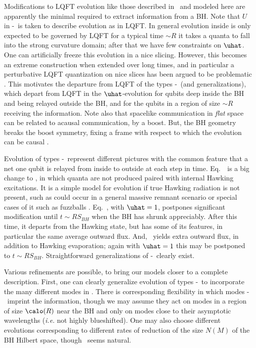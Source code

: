 Modifications to LQFT evolution like those described in \NLvC\ and modeled here are apparently the minimal required to extract information from a BH.  Note that $U$ in \evolone-\evolthree\ is taken to describe evolution as in LQFT.  In general evolution inside is only expected to be governed by LQFT for a typical time $\sim R$ it takes a quanta to fall into the strong curvature domain; after that we have few constraints on $\uhat$.  One can artificially freeze this evolution in a nice slicing.  However, this becomes an extreme construction when extended over long times, and in particular a perturbative LQFT quantization on nice slices has been argued to be problematic .  This motivates the departure from LQFT of the types \evolone-\evolthree\ (and generalizations), which depart from LQFT in the $\uhat$-evolution for qubits deep inside the BH and being relayed outside the BH, and for the qubits in a region of size $\sim R$ receiving the information.  Note also that spacelike communication in {\it flat} space can be related to acausal communication, by a boost.  But, the BH geometry breaks the boost symmetry, fixing a frame with respect to which the evolution can be causal .

Evolution of types \evolone-\evolthree\ represent different pictures with the common feature that a net one qubit is relayed from inside to outside at each step in time.  Eq.~\evolone\ is a big change to \hawkstate, in which quanta are not produced paired with internal Hawking excitations.  It is a simple model for evolution if true Hawking radiation is not present, such as could occur in a general massive remnant scenario  or special cases of it such as fuzzballs .  Eq.~\evoltwo, with $\uhat=1$, postpones significant modification until $t\sim R S_{BH}$ when the BH has shrunk appreciably. After this time, it departs from the Hawking state, but has some of its features, in particular the same average outward flux.  And, \evolthree\ yields extra outward flux, in addition to Hawking evaporation; again with $\uhat=1$ this may be postponed to $t\sim R S_{BH}$.  Straightforward generalizations of \evolone-\evolthree\ clearly exist.


Various refinements are possible, to bring our models closer to a complete description.  First, one can clearly generalize evolution of types \evolone-\evolthree\ to incorporate the many different modes in \hawkstate.  There is corresponding flexibility in which modes \evolone-\evolthree\ imprint the information, though we may assume they act on modes in a region of size $\calo(R)$ near the BH and only on modes close to their asymptotic wavelengths ({\it i.e.} not highly blueshifted).  One may also choose different evolutions corresponding to different rates of reduction of the size $N(M)$ of the BH Hilbert space, though \ndof\ seems natural.  

